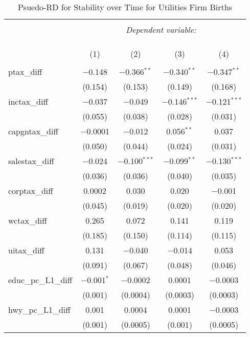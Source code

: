 
\begin{table}[!htbp] \centering 
  \caption{Psuedo-RD for Stability over Time for  Utilities Firm Births} 
  \label{} 
\begin{tabular}{@{\extracolsep{5pt}}lcccc} 
\\[-1.8ex]\hline 
\hline \\[-1.8ex] 
 & \multicolumn{4}{c}{\textit{Dependent variable:}} \\ 
\cline{2-5} 
\\[-1.8ex] & \multicolumn{4}{c}{ } \\ 
\\[-1.8ex] & (1) & (2) & (3) & (4)\\ 
\hline \\[-1.8ex] 
 ptax\_diff & $-$0.148 & $-$0.366$^{**}$ & $-$0.340$^{**}$ & $-$0.347$^{**}$ \\ 
  & (0.154) & (0.153) & (0.149) & (0.168) \\ 
  inctax\_diff & $-$0.037 & $-$0.049 & $-$0.146$^{***}$ & $-$0.121$^{***}$ \\ 
  & (0.055) & (0.038) & (0.028) & (0.031) \\ 
  capgntax\_diff & $-$0.0001 & $-$0.012 & 0.056$^{**}$ & 0.037 \\ 
  & (0.050) & (0.044) & (0.024) & (0.031) \\ 
  salestax\_diff & $-$0.024 & $-$0.100$^{***}$ & $-$0.099$^{**}$ & $-$0.130$^{***}$ \\ 
  & (0.036) & (0.036) & (0.040) & (0.035) \\ 
  corptax\_diff & 0.0002 & 0.030 & 0.020 & $-$0.001 \\ 
  & (0.045) & (0.019) & (0.020) & (0.020) \\ 
  wctax\_diff & 0.265 & 0.072 & 0.141 & 0.119 \\ 
  & (0.185) & (0.150) & (0.114) & (0.115) \\ 
  uitax\_diff & 0.131 & $-$0.040 & $-$0.014 & 0.053 \\ 
  & (0.091) & (0.067) & (0.048) & (0.046) \\ 
  educ\_pc\_L1\_diff & $-$0.001$^{*}$ & $-$0.0002 & 0.0001 & $-$0.0003 \\ 
  & (0.001) & (0.0004) & (0.0003) & (0.0003) \\ 
  hwy\_pc\_L1\_diff & 0.001 & 0.0004 & 0.0001 & $-$0.0003 \\ 
  & (0.001) & (0.0005) & (0.001) & (0.0005) \\ 

\end{tabular}
\end{table}

